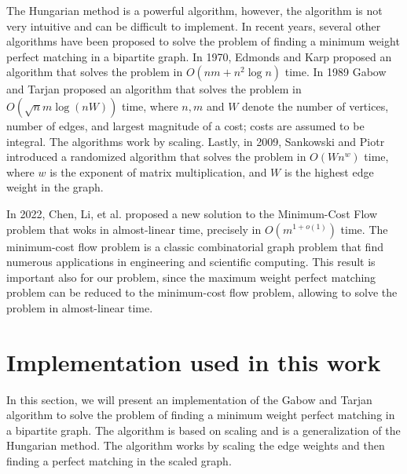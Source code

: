 The Hungarian method is a powerful algorithm, however, the algorithm is not very intuitive and can be difficult to implement. In recent years, several other algorithms have been proposed to solve the problem of finding a minimum weight perfect matching in a bipartite graph. In 1970, Edmonds and Karp \cite{edmonds1972theoretical} proposed an algorithm that solves the problem in $O(nm + n^2 \log n)$ time. In 1989 Gabow and Tarjan \cite{gabow1989faster} proposed an algorithm that solves the problem in $O(\sqrt{n}m \log(nW))$ time,  where $n,m$ and $W$ denote the number of vertices, number of edges, and largest magnitude of a cost; costs are assumed to be integral. The algorithms work by scaling. Lastly, in 2009, Sankowski and Piotr \cite{sankowski2009maximum} introduced a randomized algorithm that solves the problem in $O(Wn^w)$ time, where $w$ is the exponent of matrix multiplication, and $W$ is the highest edge weight in the graph.

In 2022, Chen, Li, et al. \cite{chen2022maximum} proposed a new solution to the Minimum-Cost Flow problem that woks in almost-linear time, precisely in $O(m^{1+o(1)})$ time. The minimum-cost flow problem is a classic combinatorial graph
problem that find numerous applications in engineering and
scientific computing. This result is important also for our problem, since the maximum weight perfect matching problem can be reduced to the minimum-cost flow problem, allowing to solve the problem in almost-linear time.

\section{Implementation used in this work}
In this section, we will present an implementation of the Gabow and Tarjan algorithm to solve the problem of finding a minimum weight perfect matching in a bipartite graph. The algorithm is based on scaling and is a generalization of the Hungarian method. The algorithm works by scaling the edge weights and then finding a perfect matching in the scaled graph. 
